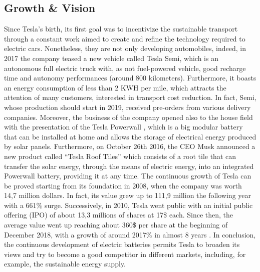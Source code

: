 \subsection{Growth \& Vision}
Since Tesla's birth, its first goal was to incentivize the sustainable transport through a constant work aimed to create and refine the technology required to electric cars. Nonetheless, they are not only developing automobiles, indeed, in 2017 the company teased a new vehicle called Tesla Semi, which is an autonomous full electric truck with, as not fuel-powered vehicle, good recharge time and autonomy performances (around 800 kilometers). Furthermore, it boasts an energy consumption of less than 2 KWH per mile, which attracts the attention of many customers, interested in transport cost reduction. In fact, Semi, whose production should start in 2019, received pre-orders from various delivery companies.  
Moreover, the business of the company opened also to the house field with the presentation of the Tesla Powerwall \cite{Powerwall}, which is a big modular battery that can be installed at home and allows the storage of electrical energy produced by solar panels. Furthermore, on October 26th 2016, the CEO Musk announced a new product called “Tesla Roof Tiles” which consists of a root tile that can transfer the solar energy, through the means of electric energy, into an integrated Powerwall battery, providing it at any time.
The continuous growth of Tesla can be proved starting from its foundation in 2008, when the company was worth 14,7 million dollars. In fact, its value grew up to 111,9 million the following year with a 661\% surge. Successively, in 2010, Tesla went public with an initial public offering (IPO) of about 13,3 millions of shares at 17\$ each. Since then, the average value went up reaching about 360\$ per share at the beginning of December 2018, with a growth of around 2017\% in almost 8 years \cite{Growth}. 
In conclusion, the continuous development of electric batteries permits Tesla to broaden its views and try to become a good competitor in different markets, including, for example, the sustainable energy supply.
